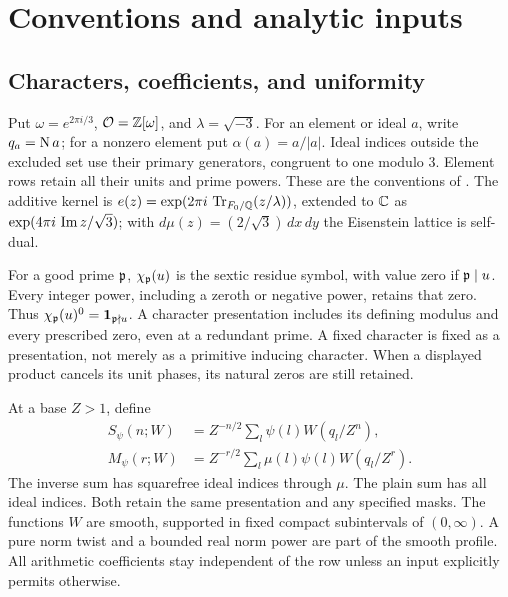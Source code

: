 \section{Conventions and analytic inputs}\label{sec:inputs}
\subsection{Characters, coefficients, and uniformity}
Put $\omega=e^{2\pi i/3}$, $\mathcal O=\mathbb Z[\omega]$, and $\lambda=\sqrt{-3}$. For an element or ideal $a$, write $q_a=\operatorname{N} a$; for a nonzero element put $\alpha(a)=a/|a|$. Ideal indices outside the excluded set use their primary generators, congruent to one modulo $3$. Element rows retain all their units and prime powers. These are the conventions of .
The additive kernel is $e(z)=\exp(2\pi i\,\operatorname{Tr}_{{F_0}/\mathbb Q}(z/\lambda))$, extended to $\mathbb C$ as $\exp(4\pi i\,\operatorname{Im} z/\sqrt3)$; with $d\mu(z)=(2/\sqrt3)\,dx\,dy$ the Eisenstein lattice is self-dual.

For a good prime $\mathfrak p$, $\chi_\mathfrak p(u)$ is the sextic residue symbol, with value zero if $\mathfrak p\mid u$. Every integer power, including a zeroth or negative power, retains that zero. Thus $\chi_\mathfrak p(u)^0=\mathbf 1_{\mathfrak p\nmid u}$. A character presentation includes its defining modulus and every prescribed zero, even at a redundant prime. A fixed character is fixed as a presentation, not merely as a primitive inducing character. When a displayed product cancels its unit phases, its natural zeros are still retained.

At a base $Z>1$, define
\begin{align}
 S_\psi(n;W)&=Z^{-n/2}\sum_l\psi(l)W(q_l/Z^n),\label{eq:plain}\\
 M_\psi(r;W)&=Z^{-r/2}\sum_l\mu(l)\psi(l)W(q_l/Z^r).\label{eq:inverse}
\end{align}
The inverse sum has squarefree ideal indices through $\mu$. The plain sum has all ideal indices. Both retain the same presentation and any specified masks. The functions $W$ are smooth, supported in fixed compact subintervals of $(0,\infty)$. A pure norm twist and a bounded real norm power are part of the smooth profile. All arithmetic coefficients stay independent of the row unless an input explicitly permits otherwise.

